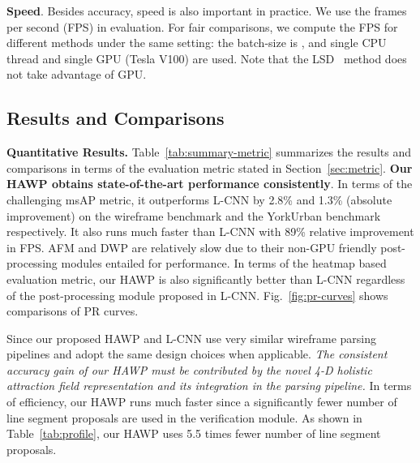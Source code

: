 \documentclass[10pt,twocolumn,letterpaper]{article}
\begin{document}
\textbf{{Speed}}. Besides accuracy, speed is also important in practice. We use the frames per second (FPS) in evaluation. For fair comparisons, we compute the FPS for different methods under the same setting: the batch-size is , and single CPU thread and single GPU (Tesla V100) are used. Note that the LSD~\cite{VonGioi2010} method does not take advantage of GPU.

\subsection{Results and Comparisons}\label{sec:results}
\vspace{-2mm}
\textbf{Quantitative Results.} Table~\ref{tab:summary-metric} summarizes the results  and comparisons in terms of the evaluation metric stated in Section~\ref{sec:metric}. \textbf{Our HAWP obtains state-of-the-art performance consistently}. In terms of the challenging msAP metric, it outperforms L-CNN by 2.8\% and 1.3\% (absolute improvement) on the wireframe benchmark and the YorkUrban benchmark respectively. It also runs much faster than  L-CNN  with 89\% relative improvement in FPS. AFM and DWP are relatively slow due to their non-GPU friendly post-processing modules entailed for performance. In terms of the heatmap based evaluation metric, our  HAWP is also significantly better than L-CNN regardless of the post-processing module proposed in L-CNN. Fig.~\ref{fig:pr-curves} shows comparisons of PR curves.  

Since our proposed HAWP and L-CNN use very similar wireframe parsing pipelines and adopt the same design choices when applicable. \textit{The consistent accuracy gain of our HAWP must be contributed by the novel 4-D holistic attraction field representation and its integration in the parsing pipeline.} In terms of efficiency, our HAWP runs much faster since a significantly fewer number of line segment proposals are used in the verification module. As shown in Table~\ref{tab:profile}, our HAWP uses 5.5 times fewer number of line segment proposals.   



\begin{table}[]
    \centering
\caption{Performance profiling on the Wireframe dataset. \#Proposals represents the number of line segments in verification. The average number of groundtruth is listed in the last row.
}
\label{tab:profile}
\end{table}
\end{document}
